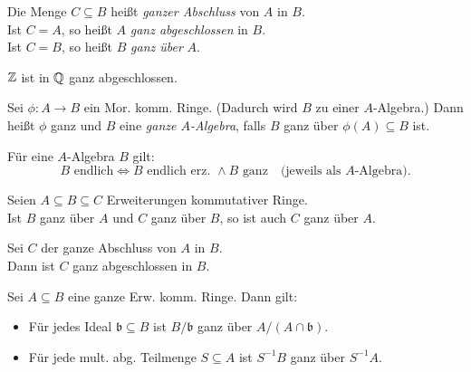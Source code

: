 \documentclass{cheat-sheet}
\newcommand{\bbb}{\mathfrak{b}}
\begin{document}

\begin{defn}
  \begin{minipage}[t]{0.88 \linewidth}
    Die Menge $C \subseteq B$ heißt \emph{ganzer Abschluss} von $A$ in $B$. \\
    Ist $C = A$, so heißt $A$ \emph{ganz abgeschlossen} in $B$. \\
    Ist $C = B$, so heißt $B$ \emph{ganz über} $A$.
  \end{minipage}
\end{defn}

\begin{bsp}
  $\mathbb{Z}$ ist in $\mathbb{Q}$ ganz abgeschlossen.
\end{bsp}

\begin{defn}
  Sei $\phi : A \to B$ ein Mor. komm. Ringe.
  (Dadurch wird $B$ zu einer $A$-Algebra.)
  Dann heißt $\phi$ ganz und $B$ eine \emph{ganze $A$-Algebra}, falls $B$ ganz über $\phi(A) \subseteq B$ ist.
\end{defn}

\begin{lem}
  Für eine $A$-Algebra $B$ gilt:
  \[
    B \text{ endlich} \iff B \text{ endlich erz. } \wedge B \text{ ganz}
    \quad \text{(jeweils als $A$-Algebra)}.
  \]
\end{lem}

\begin{kor}
  Seien $A \subseteq B \subseteq C$ Erweiterungen kommutativer Ringe. \\
  Ist $B$ ganz über $A$ und $C$ ganz über $B$, so ist auch $C$ ganz über $A$.
\end{kor}

\begin{kor}
  Sei $C$ der ganze Abschluss von $A$ in $B$. \\
  Dann ist $C$ ganz abgeschlossen in $B$.
\end{kor}

\begin{prop}
  Sei $A \subseteq B$ eine ganze Erw. komm. Ringe.
  Dann gilt:
  \begin{itemize}
    \item Für jedes Ideal $\bbb \subseteq B$ ist $B/\bbb$ ganz über $A / (A \cap \bbb)$.
    \item Für jede mult. abg. Teilmenge $S \subseteq A$ ist $S^{-1} B$ ganz über $S^{-1} A$.
  \end{itemize}
\end{prop}
\end{document}
